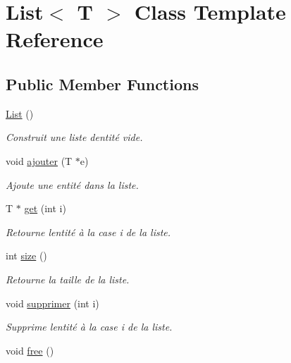 \hypertarget{classList}{}\section{List$<$ T $>$ Class Template Reference}
\label{classList}
\subsection*{Public Member Functions}
\begin{DoxyCompactItemize}
\item 
\mbox{\label{classList_a5c5e27671b21b3815d4e25b953c69454}} 
\hyperlink{classList_a5c5e27671b21b3815d4e25b953c69454}{List} ()
\begin{DoxyCompactList}\small\item\em Construit une liste d\textquotesingle{}entité vide. \end{DoxyCompactList}\item 
void \hyperlink{classList_a9ac31f8b7436b532c00e3cad6d75784c}{ajouter} (T $\ast$e)
\begin{DoxyCompactList}\small\item\em Ajoute une entité dans la liste. \end{DoxyCompactList}\item 
T $\ast$ \hyperlink{classList_a6806f565edaf5819c0078c3d144bed8b}{get} (int i)
\begin{DoxyCompactList}\small\item\em Retourne l\textquotesingle{}entité à la case i de la liste. \end{DoxyCompactList}\item 
int \hyperlink{classList_a2497bdf42246d61237aaf046c116183a}{size} ()
\begin{DoxyCompactList}\small\item\em Retourne la taille de la liste. \end{DoxyCompactList}\item 
void \hyperlink{classList_a899168b34e19805a4bcf6378583aa501}{supprimer} (int i)
\begin{DoxyCompactList}\small\item\em Supprime l\textquotesingle{}entité à la case i de la liste. \end{DoxyCompactList}\item 
\mbox{\label{classList_a29cb6681b3f5514f747d04661b08cfd6}} 
void \hyperlink{classList_a29cb6681b3f5514f747d04661b08cfd6}{free} ()

\end{DoxyCompactItemize}
